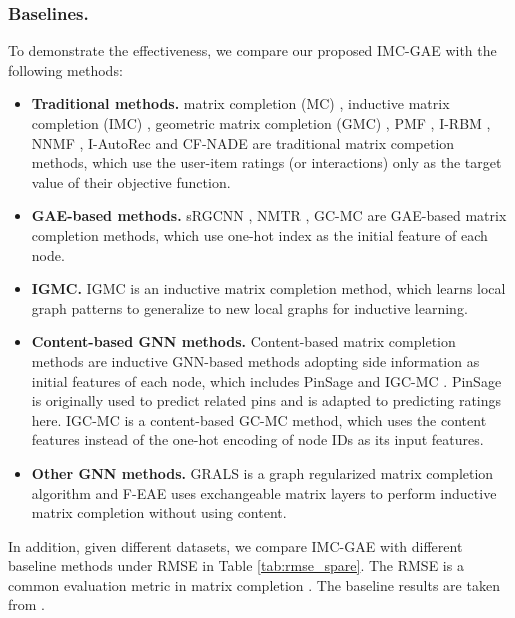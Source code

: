 \documentclass[sigconf]{acmart}
\begin{document}
\subsubsection{Baselines.} 
To demonstrate the effectiveness, we compare our proposed IMC-GAE with the following methods:    
\begin{itemize}[leftmargin=*]
    \item \textbf{Traditional methods.} matrix completion (MC) \cite{candes2009exact}, inductive matrix completion (IMC) \cite{jain2013provable}, geometric matrix completion (GMC) \cite{kalofolias2014matrix}, PMF \cite{mnih2007probabilistic}, I-RBM \cite{salakhutdinov2007restricted}, NNMF \cite{dziugaite2015neural}, I-AutoRec \cite{sedhain2015autorec} and CF-NADE \cite{zheng2016neural} are traditional matrix competion methods, which use the user-item ratings (or interactions) only as the target value of their objective function.
    \item \textbf{GAE-based methods.} sRGCNN \cite{10.5555/3294996.3295127}, NMTR \cite{gao2019neural}, GC-MC \cite{berg2017graph} are GAE-based matrix completion methods, which use one-hot index as the initial feature of each node.
    \item \textbf{IGMC.} IGMC \cite{zhang2019inductive} is an inductive matrix completion method, which learns local graph patterns to generalize to new local graphs for inductive learning.
    \item \textbf{Content-based GNN methods.} Content-based matrix completion methods are inductive GNN-based methods adopting side information as initial features of each node, which includes PinSage \cite{ying2018graph} and IGC-MC \cite{berg2017graph}. PinSage is originally used to predict related pins and is adapted to predicting ratings here. IGC-MC is a content-based GC-MC method, which uses the content features instead of the one-hot encoding of node IDs as its input features.
    \item \textbf{Other GNN methods.} GRALS \cite{rao2015collaborative} is a graph regularized matrix completion algorithm and F-EAE \cite{hartford2018deep} uses exchangeable matrix layers to perform inductive matrix completion without using content.  
\end{itemize}
 In addition, given different datasets, we compare IMC-GAE with different baseline methods under RMSE in Table \ref{tab:rmse_spare}. The RMSE is a common evaluation metric in matrix completion \cite{zhang2019inductive, berg2017graph}. The baseline results are taken from \cite{zhang2019inductive}.  
 
\end{document}
